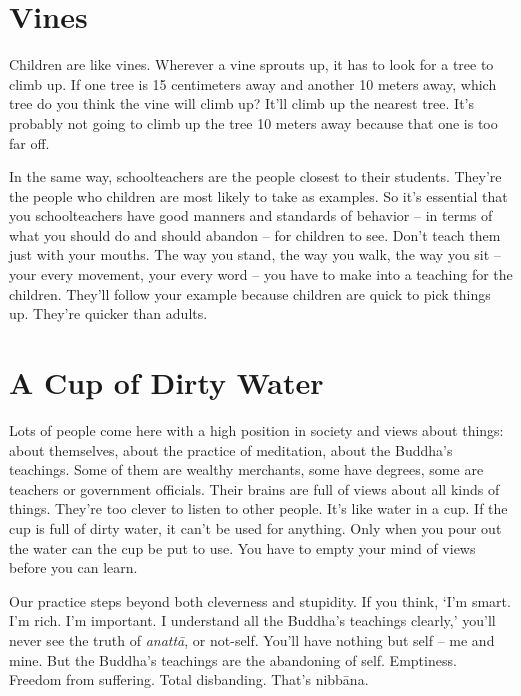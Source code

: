 \clearpage

\section{Vines}

Children are like vines. Wherever a vine sprouts up, it has to look for a tree to climb up. If one tree is 15 centimeters away and another 10 meters away, which tree do you think the vine will climb up? It'll climb up the nearest tree. It's probably not going to climb up the tree 10 meters away because that one is too far off.

In the same way, schoolteachers are the people closest to their students. They're the people who children are most likely to take as examples. So it's essential that you schoolteachers have good manners and standards of behavior -- in terms of what you should do and should abandon -- for children to see. Don't teach them just with your mouths. The way you stand, the way you walk, the way you sit -- your every movement, your every word -- you have to make into a teaching for the children. They'll follow your example because children are quick to pick things up. They're quicker than adults.

\clearpage

\section{A Cup of Dirty Water}

Lots of people come here with a high position in society and views about things: about themselves, about the practice of meditation, about the Buddha's teachings. Some of them are wealthy merchants, some have degrees, some are teachers or government officials. Their brains are full of views about all kinds of things. They're too clever to listen to other people. It's like water in a cup. If the cup is full of dirty water, it can't be used for anything. Only when you pour out the water can the cup be put to use. You have to empty your mind of views before you can learn. 

Our practice steps beyond both cleverness and stupidity. If you think, `I'm smart. I'm rich. I'm important. I understand all the Buddha's teachings clearly,' you'll never see the truth of \textit{anatt\=a}, or not-self. You'll have nothing but self -- me and mine. But the Buddha's teachings are the abandoning of self. Emptiness. Freedom from suffering. Total disbanding. That's nibb\=ana.

